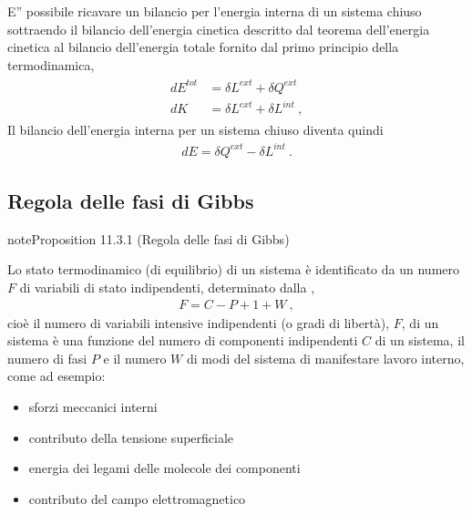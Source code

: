 \documentclass[letterpaper,10pt,italian]{jupyterBook}
\begin{document}
\sphinxAtStartPar
E” possibile ricavare un bilancio per l’energia interna di un sistema chiuso sottraendo il bilancio dell’energia cinetica descritto dal teorema dell’energia cinetica al bilancio dell’energia totale fornito dal primo principio della termodinamica,
\begin{equation*}
\begin{split}\begin{aligned}
  d E^{tot} & = \delta L^{ext} + \delta Q^{ext} \\
  d K       & = \delta L^{ext} + \delta L^{int} \ ,
\end{aligned}\end{split}
\end{equation*}
\sphinxAtStartPar
Il bilancio dell’energia interna per un sistema chiuso diventa quindi
\begin{equation*}
\begin{split}d E = \delta Q^{ext} - \delta L^{int} \ .\end{split}
\end{equation*}

\subsection{Regola delle fasi di Gibbs}
\label{\detokenize{ch/thermodynamics/principles-gibbs-phase-rule:regola-delle-fasi-di-gibbs}}\label{\detokenize{ch/thermodynamics/principles-gibbs-phase-rule:physics-hs-thermodynamics-foundation-principles-gibbs-phase-rule-gibbs-phase-rule}}\label{ch/thermodynamics/principles-gibbs-phase-rule:proposition-3}
\begin{sphinxadmonition}{note}{Proposition 11.3.1 (Regola delle fasi di Gibbs)}



\sphinxAtStartPar
Lo stato termodinamico (di equilibrio) di un sistema è identificato da un numero \(F\) di variabili di stato  indipendenti, determinato dalla ,
\begin{equation*}
\begin{split}F = C - P + 1 + W \ ,\end{split}
\end{equation*}
\sphinxAtStartPar
cioè il numero di variabili intensive indipendenti (o gradi di libertà), \(F\), di un sistema è una funzione del numero di componenti indipendenti \(C\) di un sistema, il numero di fasi \(P\) e il numero \(W\) di modi del sistema di manifestare lavoro interno, come ad esempio:
\begin{itemize}
\item {} 
\sphinxAtStartPar
sforzi meccanici interni

\item {} 
\sphinxAtStartPar
contributo della tensione superficiale

\item {} 
\sphinxAtStartPar
energia dei legami delle molecole dei componenti

\item {} 
\sphinxAtStartPar
contributo del campo elettromagnetico

\end{itemize}
\end{sphinxadmonition}
\end{document}
